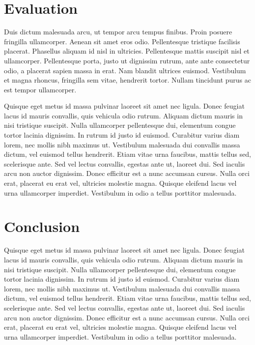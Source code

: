 \documentclass[conference]{IEEEtran}
\begin{document}
\section{Evaluation}

Duis dictum malesuada arcu, ut tempor arcu tempus finibus. Proin posuere fringilla ullamcorper. Aenean sit amet eros odio. Pellentesque tristique facilisis placerat. Phasellus aliquam id nisl in ultricies. Pellentesque mattis suscipit nisl et ullamcorper. Pellentesque porta, justo ut dignissim rutrum, ante ante consectetur odio, a placerat sapien massa in erat. Nam blandit ultrices euismod. Vestibulum et magna rhoncus, fringilla sem vitae, hendrerit tortor. Nullam tincidunt purus ac est tempor ullamcorper.

Quisque eget metus id massa pulvinar laoreet sit amet nec ligula. Donec feugiat lacus id mauris convallis, quis vehicula odio rutrum. Aliquam dictum mauris in nisi tristique suscipit. Nulla ullamcorper pellentesque dui, elementum congue tortor lacinia dignissim. In rutrum id justo id euismod. Curabitur varius diam lorem, nec mollis nibh maximus ut. Vestibulum malesuada dui convallis massa dictum, vel euismod tellus hendrerit. Etiam vitae urna faucibus, mattis tellus sed, scelerisque ante. Sed vel lectus convallis, egestas ante ut, laoreet dui. Sed iaculis arcu non auctor dignissim. Donec efficitur est a nunc accumsan cursus. Nulla orci erat, placerat eu erat vel, ultricies molestie magna. Quisque eleifend lacus vel urna ullamcorper imperdiet. Vestibulum in odio a tellus porttitor malesuada.

\section{Conclusion}

Quisque eget metus id massa pulvinar laoreet sit amet nec ligula. Donec feugiat lacus id mauris convallis, quis vehicula odio rutrum. Aliquam dictum mauris in nisi tristique suscipit. Nulla ullamcorper pellentesque dui, elementum congue tortor lacinia dignissim. In rutrum id justo id euismod. Curabitur varius diam lorem, nec mollis nibh maximus ut. Vestibulum malesuada dui convallis massa dictum, vel euismod tellus hendrerit. Etiam vitae urna faucibus, mattis tellus sed, scelerisque ante. Sed vel lectus convallis, egestas ante ut, laoreet dui. Sed iaculis arcu non auctor dignissim. Donec efficitur est a nunc accumsan cursus. Nulla orci erat, placerat eu erat vel, ultricies molestie magna. Quisque eleifend lacus vel urna ullamcorper imperdiet. Vestibulum in odio a tellus porttitor malesuada.



\end{document}
